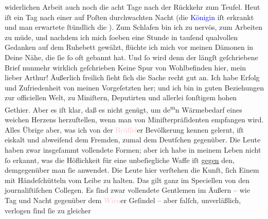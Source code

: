                widerlichen Arbeit auch noch die acht Tage nach der Rückkehr zum Teufel. Heut iſt ein Tag nach einer auf Poſten durchwachten Nacht
               (die \textcolor{blue}{Königin}{} iſt erkrankt
               und man erwartete ſtündlich die \label{K_L02668-77v}\label{K_L02668-77h}). Zum Schlafen bin ich zu nervös,
               zum Arbeiten zu müde, {\pb}und nachdem ich mich ſoeben
               eine Stunde in tauſend qualvollen Gedanken auf dem Ruhebett gewälzt, flüchte ich mich
               vor meinen Dämonen in Deine Nähe, die ſie ſo oft gebannt hat. Und ſo wird denn der
               längſt geſchriebene Brief nunmehr wirklich geſchrieben{\dotsfive}\pend
           \pstart
           Keine Spur von Wohlbefinden hier, mein lieber Arthur! Äußerlich freilich ſieht ſich
               die Sache recht gut an. Ich habe Erfolg und Zufriedenheit von meinen Vorgeſetzten
               her; und ich bin in guten Beziehungen zur officiellen Welt, zu Miniſtern, Deputirten
               und allerlei ſonſtigem hohen Gethier. Aber es iſt klar, daß \strikeout{\textcolor{gray}{d}} es nicht genügt, um de\substVorne{}\textsuperscript{m}\substDazwischen{}n\substHinten{} Wärmebedarf eines weichen Herzens herzuſtellen, wenn man von
               Miniſterpräſidenten empfangen wird. Alles Übrige aber, was ich von der \textcolor{pink}{Brüſſel}{}\ledrightnote{\textcolor{pink}{Brüssel}}er Bevölkerung kennen gelernt, iſt eiskalt
               und abweiſend dem Fremden, zumal dem Deutſchen gegenüber. Die Leute haben zwar  insgeſammt vollendete Formen; aber ich habe in
               meinem Leben nicht ſo erkannt, was die Höflichkeit für eine unbeſiegliche {\pb}Waffe iſt \uline{gegen} den,
               demgegenüber man ſie anwendet. Die Leute hier verſtehen die Kunſt, ſich Einem mit
               Händeſchütteln vom  Leibe zu halten. Das gilt
               ganz im Speciellen von den journaliſtiſchen Collegen. Es ſind zwar vollendete
               Gentlemen im Äußern – wie Tag und Nacht gegenüber dem \textcolor{pink}{Wien}{}\ledrightnote{\textcolor{pink}{Wien}}er Geſindel – aber falſch, unverläßlich, verlogen ſind ſie zu gleicher
